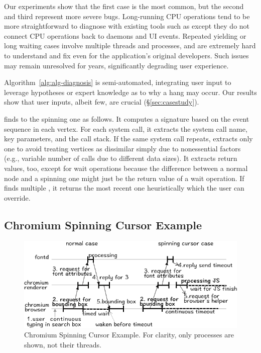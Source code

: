 Our experiments show that the first case is the most common, but the
second and third represent more severe bugs. Long-running CPU operations
tend to be more straightforward to diagnose with existing tools such as
\spindump except they do not connect CPU operations back to daemons and UI
events. Repeated yielding or long waiting cases involve multiple threads
and processes, and are extremely hard to understand and fix even for the
application's original developers.  Such issues may remain unresolved for
years, significantly degrading user experience.

Algorithm~\ref{alg:alg-diagnosis} is semi-automated, integrating user
input to leverage hypotheses or expert knowledge as to why a hang may
occur. Our results show that user inputs, albeit few, are crucial
(\S\ref{sec:casestudy}).

 \xxx finds \similarnodes to the spinning one
as follows. It computes a signature based on the event sequence in each
vertex. For each system call, it extracts the system call name, key
parameters, and the call stack. If the same system call repeats, \xxx
extracts only one to avoid treating vertices as dissimilar simply due to
nonessential factors (e.g., variable number of  calls due to
different data sizes).  It extracts return values, too, except for wait
operations because the difference between a normal node and a spinning one
might just be the return value of a wait operation.  If \xxx finds
multiple \similarnodes, it returns the most recent one heuristically
which the user can override.

\subsection{Chromium Spinning Cursor Example} \label{subsec:chromium}

\begin{figure}[tb]
	\footnotesize
    \centering
	\includegraphics[width=\columnwidth]{./figures/chromium_case_study_1.png}
    \caption{Chromium Spinning Cursor Example. For clarity, only processes are
shown, not their threads.}
    \label{fig:chromium-case-study}
\end{figure}

